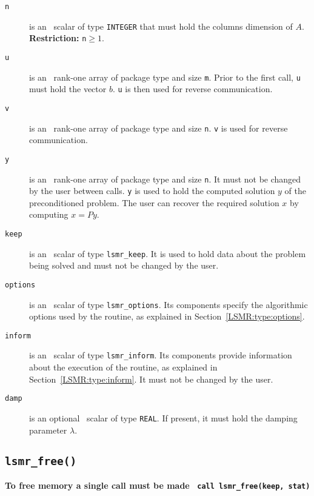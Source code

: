 \begin{description}
\item[\texttt{n}] is an \intentin\ scalar of type {\tt INTEGER} that must hold 
the columns dimension of $A$.  {\bf Restriction:} {\tt n}$ \ge 1$.

\item[\texttt{u}] is an \intentinout\ rank-one array of package type 
and size {\tt m}. Prior to the first call, {\tt u} must hold the vector $b$.
{\tt u} is then used for reverse communication.

\item[\texttt{v}] is an \intentinout\ rank-one array of package type 
and size {\tt n}. {\tt v} is used for reverse communication.


\item[\texttt{y}] is an \intentinout\ rank-one array of package type 
and size {\tt n}. It must not be changed by the user between calls.
{\tt y} is used to hold the computed solution $y$ of the preconditioned problem.
The user can recover the required solution $x$ by computing $x = Py$.

\item[\texttt{keep}] is an \intentinout\ scalar of type
{\tt lsmr\_keep}. It is used to hold data about the problem being
solved and must not be changed by the user.

\item[\texttt{options}] is an \intentin\ scalar of type {\tt lsmr\_options}.
Its components specify the algorithmic options used by the routine, as
explained in Section~\ref{LSMR:type:options}.

\item[\texttt{inform}] is an \intentinout\ scalar of type
{\tt lsmr\_inform}. Its components provide information about the execution
of the routine, as explained in Section~\ref{LSMR:type:inform}.
It must not be changed by the user.

\item[\texttt{damp}] is an optional \intentin\ scalar of type
{\tt REAL}. If present, it must hold the damping parameter $\lambda$.

\end{description}



\subsection{\texttt{lsmr\_free()}}
\textbf{To free memory a single call must be made
   \vspace{0.2cm}
    \texttt{ \hspace*{0.2cm}
      call lsmr\_free(keep, stat)
   }
}
\vspace{0.2cm}

